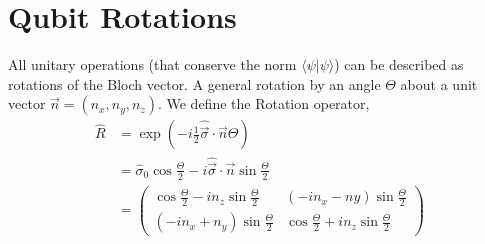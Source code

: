 \documentclass[a4paper, 11pt, normalem]{report}
\begin{document}
\section{Qubit Rotations}
All unitary operations (that conserve the norm $\langle\psi|\psi\rangle$) can be described as rotations of the Bloch vector.
A general rotation by an angle $\Theta$ about a unit vector $\vec{n}=(n_x,n_y,n_z)$.
We define the Rotation operator,
\begin{align}
    \hat{R} &= \exp\left(-i\frac12\hat{\vec{\sigma}}\cdot\vec{n}\Theta\right) \\
            &= \hat{\sigma}_0\cos\frac{\Theta}{2} - i\hat{\vec{\sigma}}\cdot\vec{n}\sin\frac{\Theta}{2} \\
            &= \begin{pmatrix} \cos\frac{\Theta}{2}-in_z\sin\frac{\Theta}{2} & \left(-in_x-ny\right)\sin\frac{\Theta}{2} \\ \left(-in_x+n_y\right)\sin\frac{\Theta}{2} & \cos\frac{\Theta}{2}+in_z\sin\frac{\Theta}{2}  \end{pmatrix}
\end{align}
\end{document}
